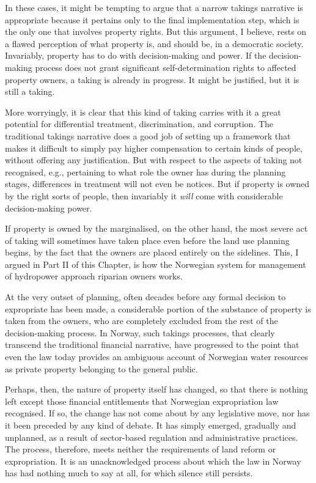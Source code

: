 {{In these cases, it might be tempting to argue that a narrow takings narrative is appropriate because it pertains only to the final implementation step, which is the only one that involves property rights. But this argument, I believe, rests on a flawed perception of what property is, and should be, in a democratic society. Invariably, property has to do with decision-making and power. If the decision-making process does not grant significant self-determination rights to affected property owners, a taking is already in progress. It might be justified, but it is still a taking. 

More worryingly, it is clear that this kind of taking carries with it a great potential for differential treatment, discrimination, and corruption. The traditional takings narrative does a good job of setting up a framework that makes it difficult to simply pay higher compensation to certain kinds of people, without offering any justification. But with respect to the aspects of taking not recognised, e.g., pertaining to what role the owner has during the planning stages, differences in treatment will not even be notices. But if property is owned by the right sorts of people, then invariably it {\it will} come with considerable decision-making power. 

If property is owned by the marginalised, on the other hand, the most severe act of taking will sometimes have taken place even before the land use planning begins, by the fact that the owners are placed entirely on the sidelines. This, I argued in Part II of this Chapter, is how the Norwegian system for management of hydropower approach riparian owners works. 

At the very outset of planning, often decades before any formal decision to expropriate has been made, a considerable portion of the substance of property is taken from the owners, who are completely excluded from the rest of the decision-making process. In Norway, such takings processes, that clearly transcend the traditional financial narrative, have progressed to the point that even the law today provides an ambiguous account of Norwegian water resources as private property belonging to the general public.

Perhaps, then, the nature of property itself has changed, so that there is nothing left except those financial entitlements that Norwegian expropriation law recognised. If so, the change has not come about by any legislative move, nor has it been preceded by any kind of debate. It has simply emerged, gradually and unplanned, as a result of sector-based regulation and administrative practices. The process, therefore, meets neither the requirements of land reform or expropriation. It is an unacknowledged process about which the law in Norway has had nothing much to say at all, for which silence still persists. 

}}
